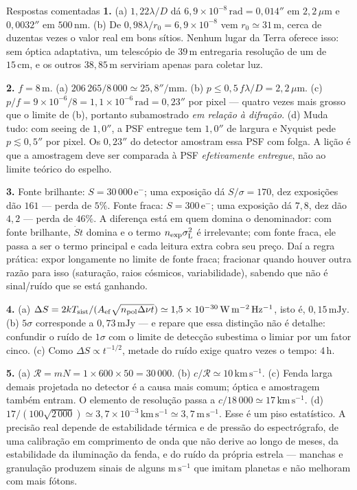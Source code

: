 \documentclass[11pt,a4paper]{article}
\begin{document}
\begin{lessonblock}[borderline west={2pt}{0pt}{astroBlue}]{Respostas comentadas}
\textbf{1.} (a) $1{,}22\lambda/D$ dá $6{,}9\times10^{-8}\,\mathrm{rad}=0{,}014''$ em $2{,}2\,\mu\mathrm{m}$ e
$0{,}0032''$ em $500\,\mathrm{nm}$. (b) De $0{,}98\lambda/r_0=6{,}9\times10^{-8}$ vem $r_0\simeq31\,\mathrm{m}$,
cerca de duzentas vezes o valor real em bons sítios. Nenhum lugar da Terra oferece isso: sem óptica adaptativa, um
telescópio de $39\,\mathrm{m}$ entregaria resolução de um de $15\,\mathrm{cm}$, e os outros
$38{,}85\,\mathrm{m}$ serviriam apenas para coletar luz.

\textbf{2.} $f=8\,\mathrm{m}$. (a) $206\,265/8\,000\simeq25{,}8''/\mathrm{mm}$. (b)
$p\le0{,}5\,f\lambda/D=2{,}2\,\mu\mathrm{m}$. (c) $p/f=9\times10^{-6}/8=1{,}1\times10^{-6}\,\mathrm{rad}=0{,}23''$
por pixel --- quatro vezes mais grosso que o limite de (b), portanto subamostrado \emph{em relação à difração}.
(d) Muda tudo: com seeing de $1{,}0''$, a PSF entregue tem $1{,}0''$ de largura e Nyquist pede
$p\lesssim0{,}5''$ por pixel. Os $0{,}23''$ do detector amostram essa PSF com folga. A lição é que a amostragem
deve ser comparada à PSF \emph{efetivamente entregue}, não ao limite teórico do espelho.

\textbf{3.} Fonte brilhante: $S=30\,000\,\mathrm{e^-}$; uma exposição dá $S/\sigma=170$, dez exposições dão
$161$ --- perda de $5\%$. Fonte fraca: $S=300\,\mathrm{e^-}$; uma exposição dá $7{,}8$, dez dão $4{,}2$ --- perda
de $46\%$. A diferença está em quem domina o denominador: com fonte brilhante, $\dot{S}t$ domina e o termo
$n_{\rm exp}\sigma_{\rm L}^{2}$ é irrelevante; com fonte fraca, ele passa a ser o termo principal e cada leitura
extra cobra seu preço. Daí a regra prática: expor longamente no limite de fonte fraca; fracionar quando houver
outra razão para isso (saturação, raios cósmicos, variabilidade), sabendo que não é sinal/ruído que se está
ganhando.

\textbf{4.} (a) $\Delta S=2kT_{\rm sist}/(A_{\rm ef}\sqrt{n_{\rm pol}\Delta\nu t})\simeq1{,}5\times10^{-30}\,
\mathrm{W\,m^{-2}\,Hz^{-1}}$, isto é, $0{,}15\,\mathrm{mJy}$. (b) $5\sigma$ corresponde a
$0{,}73\,\mathrm{mJy}$ --- e repare que essa distinção não é detalhe: confundir o ruído de $1\sigma$ com o limite
de detecção subestima o limiar por um fator cinco. (c) Como $\Delta S\propto t^{-1/2}$, metade do ruído exige
quatro vezes o tempo: $4\,\mathrm{h}$.

\textbf{5.} (a) $\mathcal{R}=mN=1\times600\times50=30\,000$. (b) $c/\mathcal{R}\simeq10\,\mathrm{km\,s^{-1}}$.
(c) Fenda larga demais projetada no detector é a causa mais comum; óptica e amostragem também entram. O elemento
de resolução passa a $c/18\,000\simeq17\,\mathrm{km\,s^{-1}}$. (d)
$17/(100\sqrt{2\,000})\simeq3{,}7\times10^{-3}\,\mathrm{km\,s^{-1}}\simeq3{,}7\,\mathrm{m\,s^{-1}}$. Esse é um
piso estatístico. A precisão real depende de estabilidade térmica e de pressão do espectrógrafo, de uma
calibração em comprimento de onda que não derive ao longo de meses, da estabilidade da iluminação da fenda, e do
ruído da própria estrela --- manchas e granulação produzem sinais de alguns $\mathrm{m\,s^{-1}}$ que imitam
planetas e não melhoram com mais fótons.


\end{lessonblock}
\end{document}
